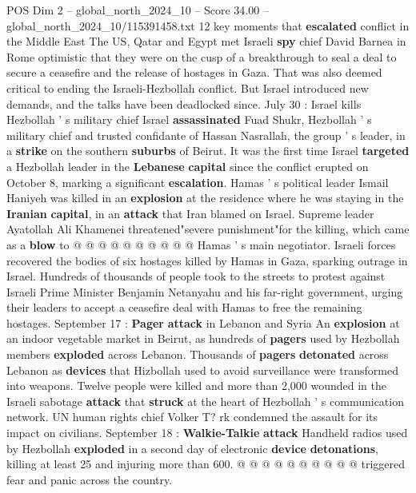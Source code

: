 \begin{textsample}{POS Dim 2 – global\_north\_2024\_10 – Score 34.00 – global\_north\_2024\_10/115391458.txt}  \label{ex:f2_pos_071}
12 key moments that \textbf{escalated} conflict in the Middle East The US, Qatar and Egypt met Israeli \textbf{spy} chief David Barnea in Rome optimistic that they were on the cusp of a breakthrough to seal a deal to secure a ceasefire and the release of hostages in Gaza.
That was also deemed critical to ending the Israeli-Hezbollah conflict.
But Israel introduced new demands, and the talks have been deadlocked since.
July 30 : Israel kills Hezbollah ' s military chief Israel \textbf{assassinated} Fuad Shukr, Hezbollah ' s military chief and trusted confidante of Hassan Nasrallah, the group ' s leader, in a \textbf{strike} on the southern \textbf{suburbs} of Beirut.
It was the first time Israel \textbf{targeted} a Hezbollah leader in the \textbf{Lebanese} \textbf{capital} since the conflict erupted on October 8, marking a significant \textbf{escalation}.
Hamas ' s political leader Ismail Haniyeh was killed in an \textbf{explosion} at the residence where he was staying in the \textbf{Iranian} \textbf{capital}, in an \textbf{attack} that Iran blamed on Israel.
Supreme leader Ayatollah Ali Khamenei threatened"severe punishment"for the killing, which came as a \textbf{blow} to @ @ @ @ @ @ @ @ @ @ Hamas ' s main negotiator.
Israeli forces recovered the bodies of six hostages killed by Hamas in Gaza, sparking outrage in Israel.
Hundreds of thousands of people took to the streets to protest against Israeli Prime Minister Benjamin Netanyahu and his far-right government, urging their leaders to accept a ceasefire deal with Hamas to free the remaining hostages.
September 17 : \textbf{Pager} \textbf{attack} in Lebanon and Syria An \textbf{explosion} at an indoor vegetable market in Beirut, as hundreds of \textbf{pagers} used by Hezbollah members \textbf{exploded} across Lebanon.
Thousands of \textbf{pagers} \textbf{detonated} across Lebanon as \textbf{devices} that Hizbollah used to avoid surveillance were transformed into weapons.
Twelve people were killed and more than 2,000 wounded in the Israeli sabotage \textbf{attack} that \textbf{struck} at the heart of Hezbollah ' s communication network.
UN human rights chief Volker T? rk condemned the assault for its impact on civilians.
September 18 : \textbf{Walkie-Talkie} \textbf{attack} Handheld radios used by Hezbollah \textbf{exploded} in a second day of electronic \textbf{device} \textbf{detonations}, killing at least 25 and injuring more than 600. @ @ @ @ @ @ @ @ @ @ triggered fear and panic across the country.

\end{textsample}
